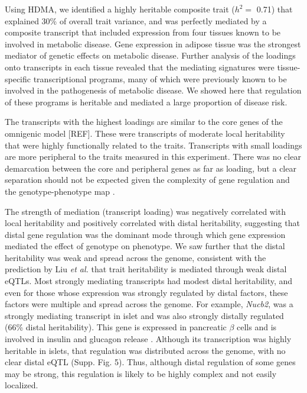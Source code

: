 \documentclass[
]{article}
\begin{document}
Using HDMA, we identified a highly heritable composite trait (\(h^2=\)
0.71) that explained 30\% of overall trait variance, and was perfectly
mediated by a composite transcript that included expression from four
tissues known to be involved in metabolic disease. Gene expression in
adipose tissue was the strongest mediator of genetic effects on
metabolic disease. Further analysis of the loadings onto transcripts in
each tissue revealed that the mediating signatures were tissue-specific
transcriptional programs, many of which were previously known to be
involved in the pathogenesis of metabolic disease. We showed here that
regulation of these programs is heritable and mediated a large
proportion of disease risk.

The transcripts with the highest loadings are similar to the core genes
of the omnigenic model {[}REF{]}. These were transcripts of moderate
local heritability that were highly functionally related to the traits.
Transcripts with small loadings are more peripheral to the traits
measured in this experiment. There was no clear demarcation between the
core and peripheral genes as far as loading, but a clear separation
should not be expected given the complexity of gene regulation and the
genotype-phenotype map \cite{pmid29906445}.

The strength of mediation (transcript loading) was negatively correlated
with local heritability and positively correlated with distal
heritability, suggesting that distal gene regulation was the dominant
mode through which gene expression mediated the effect of genotype on
phenotype. We saw further that the distal heritability was weak and
spread across the genome, consistent with the prediction by Liu
\textit{et al.} \cite{pmid31051098} that trait heritability is mediated
through weak distal eQTLs. Most strongly mediating transcripts had
modest distal heritability, and even for those whose expression was
strongly regulated by distal factors, these factors were multiple and
spread across the genome. For example, \textit{Nucb2}, was a strongly
mediating transcript in islet and was also strongly distally regulated
(66\% distal heritability). This gene is expressed in pancreatic
\(\beta\) cells and is involved in insulin and glucagon release
\cite{pmid22108805, pmid23537085, 
pmid24993278}. Although its transcription was highly heritable in
islets, that regulation was distributed across the genome, with no clear
distal eQTL (Supp. Fig. 5). Thus, although distal regulation of some
genes may be strong, this regulation is likely to be highly complex and
not easily localized.
\end{document}
